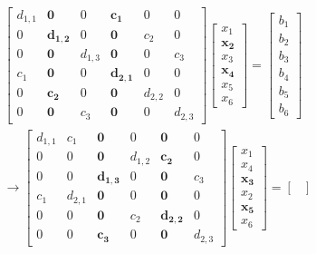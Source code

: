 \documentclass{article}
\begin{document}
\begin{align*}
    \begin{bmatrix}
        d_{1,1}  & \mathbf{0} & 0 & \mathbf{c_{1}}  & 0 & 0 \\
        0 & \mathbf{d_{1,2}} & 0  & \mathbf{0} & c_{2}  & 0 \\
        0 & \mathbf{0} & d_{1,3} & \mathbf{0} & 0 & c_{3} \\
        c_{1} & \mathbf{0} & 0& \mathbf{d_{2,1}} & 0 & 0 \\
        0 & \mathbf{c_{2}}  & 0 & \mathbf{0} & d_{2,2}  & 0 \\
        0 & \mathbf{0} & c_{3} & \mathbf{0} & 0 & d_{2,3}
    \end{bmatrix} \begin{bmatrix}
        x_{1} \\ \mathbf{x_{2}} \\ x_{3} \\ \mathbf{x_{4}} \\ x_{5} \\ x_{6}
    \end{bmatrix} = \begin{bmatrix}
        b_{1} \\ b_{2}\\ b_{3} \\ b_{4}\\ b_{5} \\ b_{6}
    \end{bmatrix} \\
    \longrightarrow\begin{bmatrix}
        d_{1,1}  & c_{1} & \mathbf{0} & 0 & \mathbf{0} & 0 \\
        0 & 0  & \mathbf{0} & d_{1,2} & \mathbf{c_{2}}  & 0 \\
        0 & 0 & \mathbf{d_{1,3}}& 0 & \mathbf{0} & c_{3} \\
        c_{1} & d_{2,1} & \mathbf{0}& 0 & \mathbf{0} & 0 \\
        0 & 0 & \mathbf{0} & c_{2} & \mathbf{d_{2,2}}  & 0 \\
        0 & 0 & \mathbf{c_{3}} & 0 & \mathbf{0} & d_{2,3}
    \end{bmatrix} \begin{bmatrix}
        x_{1} \\ x_{4} \\ \mathbf{x_{3}} \\ x_{2} \\ \mathbf{x_{5}} \\ x_{6}
    \end{bmatrix} = \begin{bmatrix}

\end{bmatrix}
\end{align*}
\end{document}
